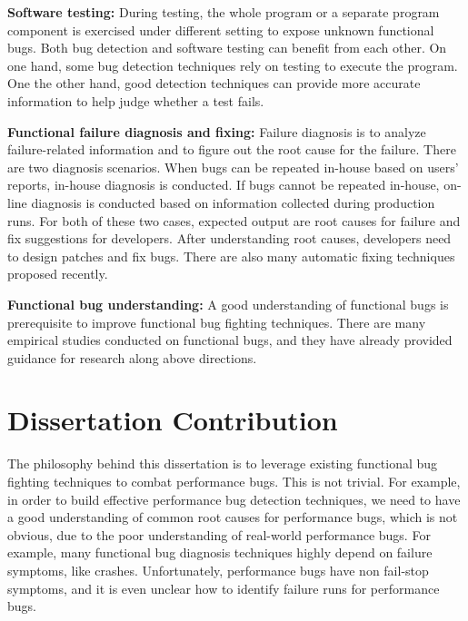 {\bf Software testing:}
During testing, the whole program or a separate program component
is exercised under different setting to expose unknown functional bugs.
Both bug detection and software testing can benefit from each other.
On one hand, some bug detection techniques rely on testing to execute the program.
One the other hand, good detection techniques can provide more accurate information
to help judge whether a test fails.

{\bf Functional failure diagnosis and fixing:}
Failure diagnosis is to analyze failure-related information
and to figure out the root cause for the failure.
There are two diagnosis scenarios.
When bugs can be repeated in-house based on users' reports, in-house diagnosis is conducted.
If bugs cannot be repeated in-house,
on-line diagnosis is conducted based on information collected during production runs.
For both of these two cases,
expected output are root causes for failure and fix suggestions for developers.
After understanding root causes,
developers need to design patches and fix bugs.
There are also many automatic fixing techniques proposed recently.

{\bf Functional bug understanding:}
A good understanding of functional bugs is prerequisite
to improve functional bug fighting techniques.
There are many empirical studies conducted on functional bugs,
and they have already provided guidance for research along above directions.

\section{Dissertation Contribution}
The philosophy behind this dissertation is to leverage existing functional bug fighting 
techniques to combat performance bugs. This is not trivial.
For example, in order to build effective performance bug detection techniques,
we need to have a good understanding of common root causes for performance bugs, 
which is not obvious, due to the poor understanding of real-world performance bugs.
For example, many functional bug diagnosis techniques highly depend on failure symptoms, like crashes. 
Unfortunately, performance bugs have non fail-stop symptoms, and it is even unclear how to identify failure runs for performance bugs. 

